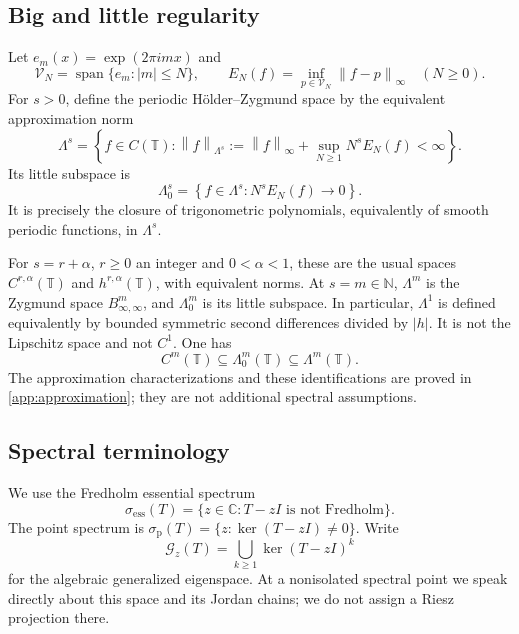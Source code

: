 \documentclass[11pt,a4paper]{article}
\numberwithin{equation}{section}
\theoremstyle{definition}
\theoremstyle{remark}
\newcommand{\C}{\mathbb C}
\newcommand{\N}{\mathbb N}
\newcommand{\T}{\mathbb T}
\newcommand{\V}{\mathcal V}
\newcommand{\ess}{\mathrm{ess}}
\newcommand{\pt}{\mathrm p}
\newcommand{\Span}{\operatorname{span}}
\newcommand{\norm}[1]{\left\lVert#1\right\rVert}
\newcommand{\Gg}[2]{\mathcal G_{#1}(#2)}
\newcommand{\smallspace}{\Lambda_0}
\begin{document}
\subsection{Big and little regularity}
Let $e_m(x)=\exp(2\pi i m x)$ and
\begin{equation}
 \V_N=\Span\{e_m:|m|\le N\},\qquad
 E_N(f)=\inf_{p\in\V_N}\norm{f-p}_\infty
 \quad(N\ge0).
 \label{eq:approx}
\end{equation}
For $s>0$, define the periodic H\"older--Zygmund space by the equivalent
approximation norm
\begin{equation}
 \Lambda^s=\left\{f\in C(\T):
 \norm f_{\Lambda^s}:=\norm f_\infty+
 \sup_{N\ge1}N^sE_N(f)<\infty\right\}.
 \label{eq:big}
\end{equation}
Its little subspace is
\begin{equation}
 \smallspace^s=\left\{f\in\Lambda^s:N^sE_N(f)\longrightarrow0\right\}.
 \label{eq:little}
\end{equation}
It is precisely the closure of trigonometric polynomials, equivalently
of smooth periodic functions, in $\Lambda^s$.

For $s=r+\alpha$, $r\ge0$ an integer and $0<\alpha<1$, these are the
usual spaces $C^{r,\alpha}(\T)$ and $h^{r,\alpha}(\T)$, with equivalent
norms. At $s=m\in\N$, $\Lambda^m$ is the Zygmund space
$B^m_{\infty,\infty}$, and $\smallspace^m$ is its little subspace.
In particular, $\Lambda^1$ is defined equivalently by bounded symmetric
second differences divided by $|h|$. It is not the Lipschitz space and
not $C^1$. One has
\begin{equation}
 C^m(\T)\subseteq\smallspace^m(\T)\subseteq\Lambda^m(\T).
 \label{eq:Cr-inclusion}
\end{equation}
The approximation characterizations and these identifications are proved
in \cref{app:approximation}; they are not additional spectral assumptions.

\subsection{Spectral terminology}
We use the Fredholm essential spectrum
\[
 \sigma_{\ess}(T)=\{z\in\C:T-zI\text{ is not Fredholm}\}.
\]
The point spectrum is $\sigma_{\pt}(T)=\{z:\ker(T-zI)\ne0\}$. Write
\begin{equation}
 \Gg{z}{T}=\bigcup_{k\ge1}\ker(T-zI)^k
 \label{eq:rootspace}
\end{equation}
for the algebraic generalized eigenspace. At a nonisolated spectral
point we speak directly about this space and its Jordan chains; we do
not assign a Riesz projection there.
\end{document}
